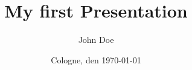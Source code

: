 \usepackage{blindtext}
\usepackage{varsfromjobname}
\usepackage{amsmath}
\usepackage{array}

\usetheme{\gettwofromjobname}

\title{My first Presentation}
\author{John Doe}
\date{Cologne, den \today}

